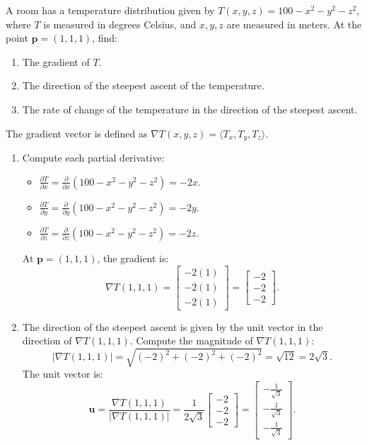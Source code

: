 \begin{example} 
A room has a temperature distribution given by \( T(x, y, z) = 100 - x^2 - y^2 - z^2 \), where \( T \) is measured in degrees Celsius, and \( x, y, z \) are measured in meters. At the point \( \mathbf{p} = (1, 1, 1) \), find:
\begin{enumerate}
    \item The gradient of \( T \).
    \item The direction of the steepest ascent of the temperature.
    \item The rate of change of the temperature in the direction of the steepest ascent.
\end{enumerate}

\begin{solution}
\noindent The gradient vector is defined as \( \nabla T(x, y, z) = \langle T_x, T_y, T_z \rangle \).

\begin{enumerate}
    \item Compute each partial derivative:
    \begin{itemize}
        \item \( \frac{\partial T}{\partial x} = \frac{\partial}{\partial x} \left( 100 - x^2 - y^2 - z^2 \right) = -2x. \)
        \item \( \frac{\partial T}{\partial y} = \frac{\partial}{\partial y} \left( 100 - x^2 - y^2 - z^2 \right) = -2y. \)
        \item \( \frac{\partial T}{\partial z} = \frac{\partial}{\partial z} \left( 100 - x^2 - y^2 - z^2 \right) = -2z. \)
    \end{itemize}

    At \( \mathbf{p} = (1, 1, 1) \), the gradient is:
    \[
    \nabla T(1, 1, 1) = \begin{bmatrix} -2(1) \\ -2(1) \\ -2(1) \end{bmatrix} = \begin{bmatrix} -2 \\ -2 \\ -2 \end{bmatrix}.
    \]

    \item The direction of the steepest ascent is given by the unit vector in the direction of \( \nabla T(1, 1, 1) \). Compute the magnitude of \( \nabla T(1, 1, 1) \):
    \[
    |\nabla T(1, 1, 1)| = \sqrt{(-2)^2 + (-2)^2 + (-2)^2} = \sqrt{12} = 2\sqrt{3}.
    \]
    The unit vector is:
    \[
    \mathbf{u} = \frac{\nabla T(1, 1, 1)}{|\nabla T(1, 1, 1)|} = \frac{1}{2\sqrt{3}} \begin{bmatrix} -2 \\ -2 \\ -2 \end{bmatrix} = \begin{bmatrix} -\frac{1}{\sqrt{3}} \\ -\frac{1}{\sqrt{3}} \\ -\frac{1}{\sqrt{3}} \end{bmatrix}.
    \]


\end{enumerate}
\end{solution}
\end{example}
